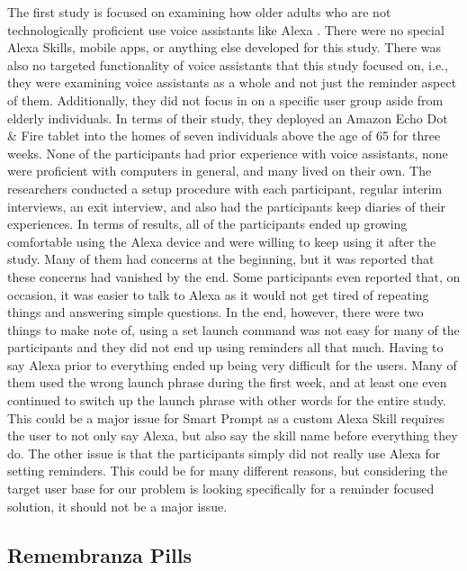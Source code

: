\documentclass[11pt, oneside]{article}
\begin{document}
The first study is focused on examining how older adults who are not technologically proficient use voice assistants like Alexa \cite{b3}. 
There were no special Alexa Skills, mobile apps, or anything else developed for this study. 
There was also no targeted functionality of voice assistants that this study focused on, i.e., they were examining voice assistants as a whole and not just the reminder aspect of them. 
Additionally, they did not focus in on a specific user group aside from elderly individuals. 
In terms of their study, they deployed an Amazon Echo Dot \& Fire tablet into the homes of seven individuals above the age of 65 for three weeks. 
None of the participants had prior experience with voice assistants, none were proficient with computers in general, and many lived on their own. 
The researchers conducted a setup procedure with each participant, regular interim interviews, an exit interview, and also had the participants keep diaries of their experiences. 
In terms of results, all of the participants ended up growing comfortable using the Alexa device and were willing to keep using it after the study. 
Many of them had concerns at the beginning, but it was reported that these concerns had vanished by the end. 
Some participants even reported that, on occasion, it was easier to talk to Alexa as it would not get tired of repeating things and answering simple questions. 
In the end, however, there were two things to make note of, using a set launch command was not easy for many of the participants and they did not end up using reminders all that much. 
Having to say Alexa prior to everything ended up being very difficult for the users. 
Many of them used the wrong launch phrase during the first week, and at least one even continued to switch up the launch phrase with other words for the entire study. 
This could be a major issue for Smart Prompt as a custom Alexa Skill requires the user to not only say Alexa, but also say the skill name before everything they do. 
The other issue is that the participants simply did not really use Alexa for setting reminders. 
This could be for many different reasons, but considering the target user base for our problem is looking specifically for a reminder focused solution, it should not be a major issue. 









\subsection{Remembranza Pills}
\end{document}
